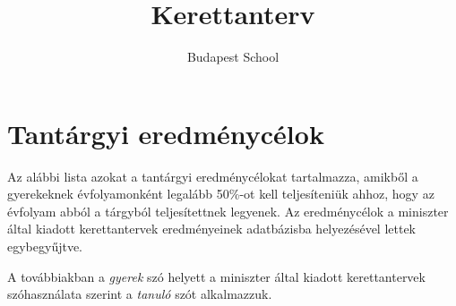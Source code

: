 \documentclass[magyar,12pt,a4paper,oneside,draf]{report}
\begin{document}
\title{Kerettanterv}
\author{Budapest School}

\maketitle

\tableofcontents
\newpage






{}
\label{sec:bibliographyk}


\chapter{Tantárgyi eredménycélok}
\label{sec:tantargyi_celok}
Az alábbi lista azokat a tantárgyi eredménycélokat tartalmazza, amikből a gyerekeknek évfolyamonként legalább 50\%-ot kell teljesíteniük ahhoz, hogy az évfolyam abból a tárgyból teljesítettnek legyenek. Az eredménycélok a miniszter által kiadott kerettantervek\cite{ofi:kerettanterv}  eredményeinek adatbázisba helyezésével lettek egybegyűjtve.

A továbbiakban a \emph{gyerek} szó helyett a miniszter által kiadott kerettantervek szóhasználata szerint a \emph{tanuló} szót alkalmazzuk.

%
\end{document}
